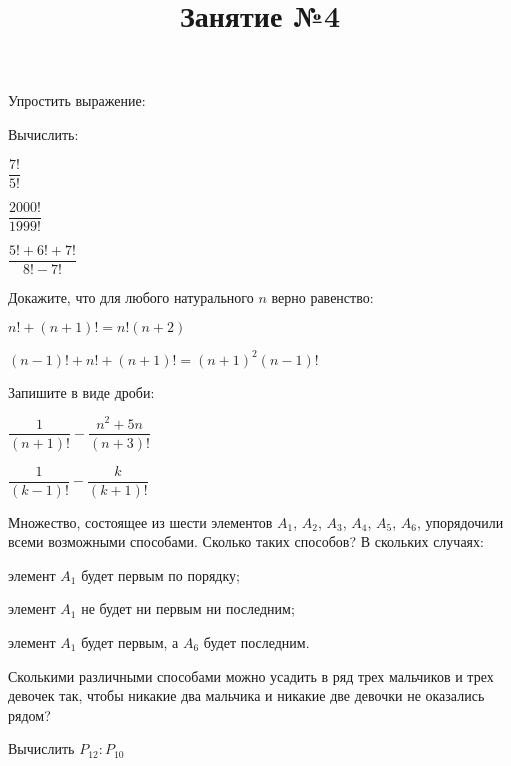 \begin{listofex}
	\item Упростить выражение:
	\begin{enumcols}[itemcolumns=1]
		\item {}
		\item {}
	\end{enumcols}
	\item Вычислить:
	\begin{enumcols}[itemcolumns=3]
		\item \( \dfrac{7!}{5!} \)
		\item \( \dfrac{2000!}{1999!} \)
		\item \( \dfrac{5!+6!+7!}{8!-7!} \)
	\end{enumcols}
	\item Докажите, что для любого натурального \( n \) верно равенство:
	\begin{enumcols}[itemcolumns=2]
		\item \( n!+(n+1)! = n!(n+2) \)
		\item \( (n-1)!+n!+(n+1)! = (n+1)^2(n-1)! \)
	\end{enumcols}
	\item Запишите в виде дроби:
	\begin{enumcols}[itemcolumns=2]
		\item \( \dfrac{1}{(n+1)!}-\dfrac{n^2+5n}{(n+3)!} \)
		\item \( \dfrac{1}{(k-1)!}-\dfrac{k}{(k+1)!} \)
	\end{enumcols}
	\item Множество, состоящее из шести элементов \( A_1 \), \( A_2 \), \( A_3 \), \( A_4 \), \( A_5 \), \( A_6 \), упорядочили всеми возможными способами. Сколько таких способов? В скольких случаях:
	\begin{enumcols}
		\item элемент \( A_1 \) будет первым по порядку;
		\item элемент \( A_1 \) не будет ни первым ни последним;
		\item элемент \( A_1 \) будет первым, а \( A_6 \) будет последним.
	\end{enumcols}
	\item Сколькими различными способами можно усадить в ряд трех мальчиков и трех девочек так, чтобы никакие два мальчика и никакие две девочки не оказались рядом?
	\item Вычислить \( P_{12}:P_{10} \)
\end{listofex}
\newpage
\title{Занятие №4}
